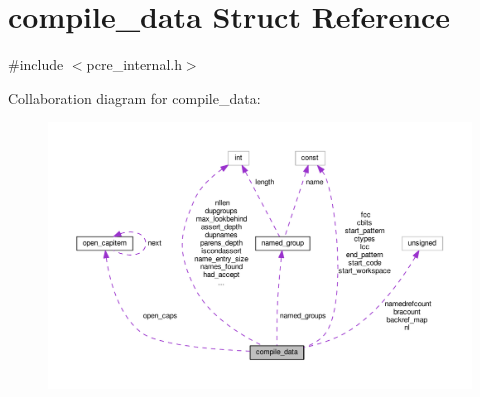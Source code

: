 \hypertarget{structcompile__data}{}\section{compile\+\_\+data Struct Reference}
\label{structcompile__data}


{\ttfamily \#include $<$pcre\+\_\+internal.\+h$>$}



Collaboration diagram for compile\+\_\+data\+:
\nopagebreak
\begin{figure}[H]
\begin{center}
\leavevmode
\includegraphics[width=350pt]{structcompile__data__coll__graph}
\end{center}
\end{figure}
